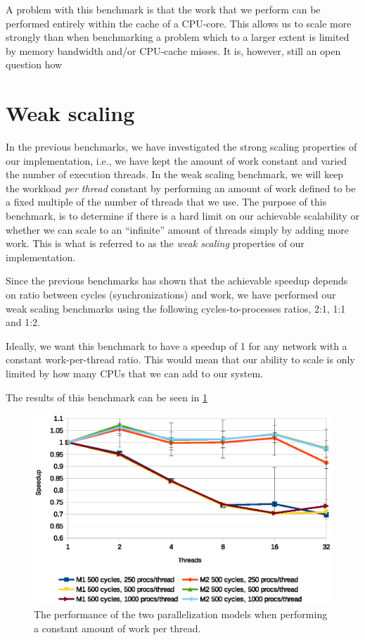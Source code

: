 A problem with this benchmark is that the work that we perform can be
performed entirely within the cache of a CPU-core. This allows us to
scale more strongly than when benchmarking a problem which to a larger
extent is limited by memory bandwidth and/or CPU-cache misses. It is,
however, still an open question how 

\section{Weak scaling}
In the previous benchmarks, we have investigated the strong scaling
properties of our implementation, i.e., we have kept the
amount of work constant and varied the number of execution threads. In the
weak scaling benchmark, we will keep the workload \textit{per thread} constant
by performing an amount of work defined to be a fixed multiple of the
number of threads that we use. The purpose of this benchmark, is to
determine if there is a hard limit on our achievable scalability or
whether we can scale to an "`infinite"' amount of threads simply by
adding more work. This is what is referred to as the \textit{weak
  scaling} properties\cite{weakscaling} of our implementation.

Since the previous benchmarks has shown that the achievable speedup
depends on ratio between cycles (synchronizations) and work, we have
performed our weak scaling benchmarks using the following
cycles-to-processes ratios, 2:1, 1:1 and 1:2.

Ideally, we want this benchmark to have a speedup of 1 for any network
with a constant work-per-thread ratio. This would mean that our ability
to scale is only limited by how many CPUs that we can add to our
system.

The results of this benchmark can be seen in \cref{fig:weak}

\begin{figure}
\centering
\includegraphics[width=\textwidth]{graphs/weak}
\caption[Weak scaling benchmark]{The performance of the two
  parallelization models when performing a constant amount of work per
thread.}
\label{fig:weak}
\end{figure}

